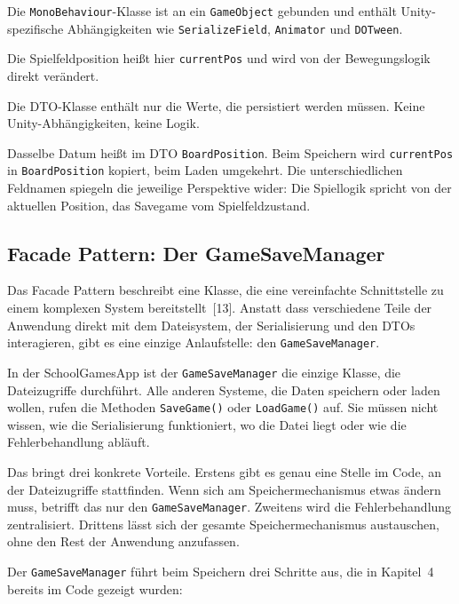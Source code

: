 \documentclass[12pt,a4paper]{article}
\begin{document}
\begin{description}[leftmargin=2em, labelwidth=1.5em]
    \item[(1)] Die \texttt{MonoBehaviour}-Klasse ist an ein \texttt{GameObject} gebunden und enthält Unity-spezifische Abhängigkeiten wie \texttt{SerializeField}, \texttt{Animator} und \texttt{DOTween}.
    \item[(2)] Die Spielfeldposition heißt hier \texttt{currentPos} und wird von der Bewegungslogik direkt verändert.
    \item[(3)] Die DTO-Klasse enthält nur die Werte, die persistiert werden müssen. Keine Unity-Abhängigkeiten, keine Logik.
    \item[(4)] Dasselbe Datum heißt im DTO \texttt{BoardPosition}. Beim Speichern wird \texttt{currentPos} in \texttt{BoardPosition} kopiert, beim Laden umgekehrt. Die unterschiedlichen Feldnamen spiegeln die jeweilige Perspektive wider: Die Spiellogik spricht von der aktuellen Position, das Savegame vom Spielfeldzustand.
\end{description}

\subsection{Facade Pattern: Der GameSaveManager}

Das Facade Pattern beschreibt eine Klasse, die eine vereinfachte Schnittstelle zu einem komplexen System bereitstellt~[13]. Anstatt dass verschiedene Teile der Anwendung direkt mit dem Dateisystem, der Serialisierung und den DTOs interagieren, gibt es eine einzige Anlaufstelle: den \texttt{GameSaveManager}.

In der SchoolGamesApp ist der \texttt{GameSaveManager} die einzige Klasse, die Dateizugriffe durchführt. Alle anderen Systeme, die Daten speichern oder laden wollen, rufen die Methoden \texttt{SaveGame()} oder \texttt{LoadGame()} auf. Sie müssen nicht wissen, wie die Serialisierung funktioniert, wo die Datei liegt oder wie die Fehlerbehandlung abläuft.

Das bringt drei konkrete Vorteile. Erstens gibt es genau eine Stelle im Code, an der Dateizugriffe stattfinden. Wenn sich am Speichermechanismus etwas ändern muss, betrifft das nur den \texttt{GameSaveManager}. Zweitens wird die Fehlerbehandlung zentralisiert. Drittens lässt sich der gesamte Speichermechanismus austauschen, ohne den Rest der Anwendung anzufassen.

Der \texttt{GameSaveManager} führt beim Speichern drei Schritte aus, die in Kapitel~4 bereits im Code gezeigt wurden:
\end{document}
